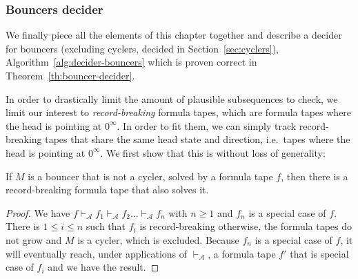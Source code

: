 \subsubsection{Bouncers decider}

We finally piece all the elements of this chapter together and describe a decider for bouncers (excluding cyclers, decided in Section~\ref{sec:cyclers}), Algorithm~\ref{alg:decider-bouncers} which is proven correct in Theorem~\ref{th:bouncer-decider}.

In order to drastically limit the amount of plausible subsequences to check, we limit our interest to \textit{record-breaking} formula tapes, which are formula tapes where the head is pointing at $0^\infty$. In order to fit them, we can simply track record-breaking tapes that share the same head state and direction, i.e.\ tapes where the head is pointing at $0^\infty$. We first show that this is without loss of generality:

\begin{lemma}\label{lem:record-breaking}
    If $M$ is a bouncer that is not a cycler, solved by a formula tape $f$, then there is a record-breaking formula tape that also solves it.
\end{lemma}
\begin{proof}
    We have $f \vdash_\mathcal{A} f_1 \vdash_\mathcal{A} f_2 \dots \vdash_\mathcal{A} f_n$ with $n \geq 1$ and $f_n$ is a special case of $f$. There is $1 \leq i \leq n$ such that $f_{i}$ is record-breaking otherwise, the formula tapes do not grow and $M$ is a cycler, which is excluded. Because $f_n$ is a special case of $f$, it will eventually reach, under applications of $\vdash_\mathcal{A}$, a formula tape $f'$ that is special case of $f_i$ and we have the result.
\end{proof}

